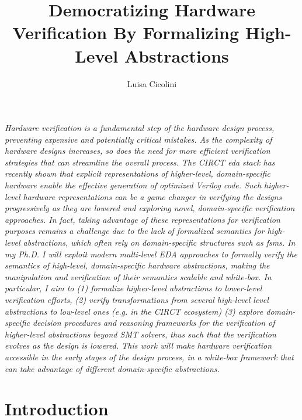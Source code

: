 \documentclass[sigconf,authorversion,nonacm, 11pt]{acmart}
\begin{document}
\title{Democratizing Hardware Verification By Formalizing High-Level Abstractions}

\author{Luisa Cicolini}

\maketitle
\thispagestyle{empty}

\textit{
    Hardware verification is a fundamental step of the hardware design process, preventing expensive and potentially critical 
    mistakes.
    As the complexity of hardware designs increases, so does the need for more efficient verification strategies that can 
    streamline the overall process.
    The CIRCT \ac{eda} stack has recently shown that explicit representations of higher-level, domain-specific 
    hardware enable the effective generation of optimized Verilog code.
    Such higher-level hardware representations can be a game changer in verifying the designs 
    progressively as they are lowered and exploring novel, domain-specific verification approaches. 
    In fact, taking advantage of these representations for verification purposes remains a challenge due to the lack of 
    formalized semantics for high-level abstractions, which often rely on domain-specific structures such as \acp{fsm}.
    In my Ph.D. I will exploit modern multi-level EDA approaches to formally verify the semantics of high-level, domain-specific 
    hardware abstractions, making the manipulation and verification of their semantics scalable and white-box.
    In particular, I aim to    
    (1) formalize higher-level abstractions to lower-level verification efforts, 
    (2) verify transformations from several high-level level abstractions to low-level ones (e.g. in the CIRCT ecosystem)
    (3) explore domain-specific decision procedures and reasoning frameworks for the verification of higher-level abstractions beyond SMT solvers, 
    thus such that the verification evolves as the design is lowered. 
    This work will make hardware verification accessible in the early stages of the design process, in a white-box framework 
    that can take advantage of different domain-specific abstractions.
}   


\section{Introduction}
\end{document}
